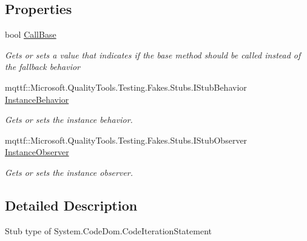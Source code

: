 \subsection*{Properties}
\begin{DoxyCompactItemize}
\item 
bool \hyperlink{class_system_1_1_code_dom_1_1_fakes_1_1_stub_code_iteration_statement_af1734cc514f4157b2f1f606e44293d0d}{Call\-Base}
\begin{DoxyCompactList}\small\item\em Gets or sets a value that indicates if the base method should be called instead of the fallback behavior\end{DoxyCompactList}\item 
mqttf\-::\-Microsoft.\-Quality\-Tools.\-Testing.\-Fakes.\-Stubs.\-I\-Stub\-Behavior \hyperlink{class_system_1_1_code_dom_1_1_fakes_1_1_stub_code_iteration_statement_a2563dba3ddebea8189db1b14b1f583d0}{Instance\-Behavior}
\begin{DoxyCompactList}\small\item\em Gets or sets the instance behavior.\end{DoxyCompactList}\item 
mqttf\-::\-Microsoft.\-Quality\-Tools.\-Testing.\-Fakes.\-Stubs.\-I\-Stub\-Observer \hyperlink{class_system_1_1_code_dom_1_1_fakes_1_1_stub_code_iteration_statement_acad0b23176021aa30cec17db25173e84}{Instance\-Observer}
\begin{DoxyCompactList}\small\item\em Gets or sets the instance observer.\end{DoxyCompactList}\end{DoxyCompactItemize}


\subsection{Detailed Description}
Stub type of System.\-Code\-Dom.\-Code\-Iteration\-Statement



